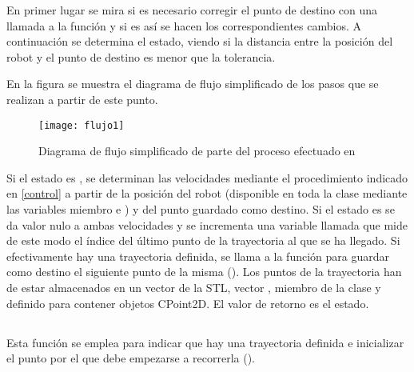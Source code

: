 \noindent
En primer lugar se mira si es necesario corregir el punto de destino con una llamada a la función  y si es así se hacen los correspondientes cambios. A continuación se determina el estado, viendo si la distancia entre la posición del robot y el punto de destino es menor que la tolerancia.

En la figura se muestra el diagrama de flujo simplificado de los pasos que se realizan a partir de este punto.

\begin{figure}[h]
  \centering\texttt{[image: flujo1]}\\
  \caption{Diagrama de flujo simplificado de parte del proceso efectuado en }\label{fg:flujo1}
\end{figure}
Si el estado es , se determinan las velocidades mediante el procedimiento indicado en \ref{control} a partir de la posición del robot (disponible en toda la clase mediante las variables miembro  e ) y del punto guardado como destino.
Si el estado es  se da valor nulo a ambas velocidades y se incrementa una variable llamada  que mide de este modo el índice del último punto de la trayectoria al que se ha llegado. Si efectivamente hay una trayectoria definida, se llama a la función  para guardar como destino el siguiente punto de la misma (). Los puntos de la trayectoria han de estar almacenados en un vector de la STL, vector , miembro de la clase y definido para contener objetos CPoint2D.
\noindent
El valor de retorno es el estado.

\subsection{}

\noindent
{}

\noindent
Esta función se emplea para indicar que hay una trayectoria definida e inicializar el punto por el que debe empezarse a recorrerla ().

\subsection{}

\noindent
{}

